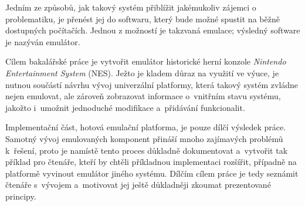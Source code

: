 Jedním ze způsobů, jak takový systém přiblížit jakémukoliv zájemci o problematiku, je přenést jej do softwaru, který bude možné spustit na běžně dostupných počítačích. Jednou z možností je takzvaná emulace; výsledný software je nazýván emulátor.

Cílem bakalářské práce je vytvořit emulátor historické herní konzole \emph{Nintendo Entertainment System} (NES). Ježto je kladem důraz na využití ve výuce, je nutnou součástí návrhu vývoj univerzální platformy, která takový systém zvládne nejen emulovat, ale zároveň zobrazovat informace o~vnitřním stavu systému, jakožto i~umožnit jednoduché modifikace a~přidávání funkcionalit.

Implementační část, hotová emulační platforma, je pouze dílčí výsledek práce. Samotný vývoj emulovaných komponent přináší mnoho zajímavých problémů k~řešení, proto je namístě tento proces důkladně dokumentovat a~vytvořit tak příklad pro čtenáře, kteří by chtěli příkladnou implementaci rozšířit, případně na platformě vyvinout emulátor jiného systému. Dílčím cílem práce je tedy seznámit čtenáře s~vývojem a~motivovat jej  ještě důkladněji zkoumat prezentované principy.


